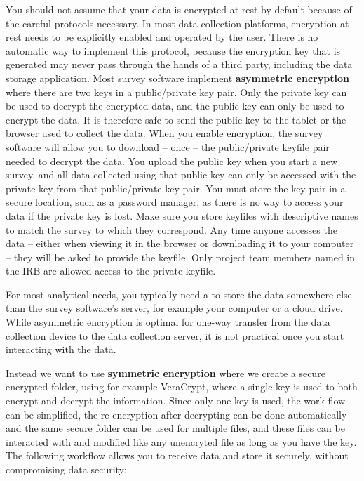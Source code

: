 You should not assume that your data is encrypted at rest by default because of 
the careful protocols necessary. In most data collection platforms, encryption at 
rest needs to be explicitly enabled and operated by the user. There is no automatic 
way to implement this protocol, because the encryption key that is generated may 
never pass through the hands of a third party, including the data storage application.
Most survey software implement \textbf{asymmetric encryption} where 
there are two keys in a public/private key pair. Only the private key can be used to
decrypt the encrypted data, and the public key can only be used to encrypt the data.
It is therefore safe to send the public key to the tablet or the browser used to
collect the data. When you enable encryption, the survey software will allow you to
download -- once -- the public/private keyfile pair needed to decrypt the data. You
upload the public key when you start a new survey, and all data collected using that
public key can only be accessed with the private key from that public/private key
pair. You must store the key pair in a secure location, such as a password manager, as
there is no way to access your data if the private key is lost. Make sure you store
keyfiles with descriptive names to match the survey to which they correspond. Any time
anyone accesses the data -- either when viewing it in the browser or downloading it to
your computer -- they will be asked to provide the keyfile. Only project team members
named in the IRB are allowed access to the private keyfile.


For most analytical needs, you typically need a to store the data somewhere else
than the survey software's server, for example your computer or a cloud drive. While
asymmetric encryption is optimal for one-way transfer from the data collection device
to the data collection server, it is not practical once you start interacting with the data.

Instead we want to use \textbf{symmetric encryption} where we
create a secure encrypted folder, using for example VeraCrypt,
where a single key is used to both encrypt and decrypt the information. Since only one
key is used, the work flow can be simplified, the re-encryption after decrypting can
be done automatically and the same secure folder can be used for multiple files, and
these files can be interacted with and modified like any unencryted file as long as you
have the key. The following workflow allows you to receive data and store it securely,
without compromising data security:

